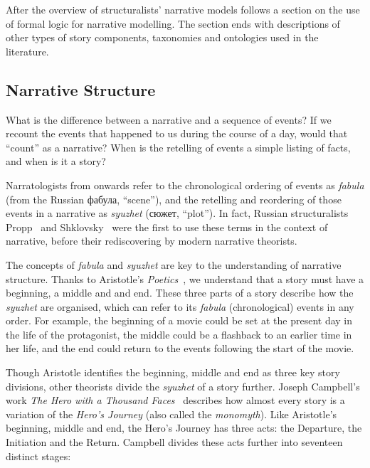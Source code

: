After the overview of structuralists' narrative models follows a section on the use of formal logic for narrative modelling. The section ends with descriptions of other types of story components, taxonomies and ontologies used in the literature.

\subsection{Narrative Structure}
What is the difference between a narrative and a sequence of events? If we
recount the events that happened to us during the course of a day, would that
``count'' as a narrative? When is the retelling of events a simple listing of
facts, and when is it a story?

Narratologists from \citep{bal2009narratology} onwards refer to the
chronological ordering of events as \emph{fabula} (from the Russian фабула, ``scene''), and the retelling and
reordering of those events in a narrative as \emph{syuzhet} (сюжет, ``plot'').
In fact, Russian structuralists Propp~\cite{propp1968morphology} and
Shklovsky~\cite{shklovsky1991theory} were the first to use these terms in the
context of narrative, before their rediscovering by modern narrative theorists.

The concepts of \emph{fabula} and \emph{syuzhet} are key to the understanding of
narrative structure. Thanks to Aristotle's
\emph{Poetics}~\cite{halliwell1968aristotle}, we understand that a story must
have a beginning, a middle and and end. These three parts of a story describe
how the \emph{syuzhet} are organised, which can refer to its \emph{fabula}
(chronological) events in any order. For example, the beginning of a movie could
be set at the present day in the life of the protagonist, the middle could be a
flashback to an earlier time in her life, and the end could return to the events
following the start of the movie.

Though Aristotle identifies the beginning, middle and end as three key story
divisions, other theorists divide the \emph{syuzhet} of a story further. Joseph
Campbell's work \emph{The Hero with a Thousand Faces}~\cite{campbell2008hero}
describes how almost every story is a variation of the \emph{Hero's Journey}
(also called the \emph{monomyth}). Like Aristotle's beginning, middle and end,
the Hero's Journey has three acts: the Departure, the Initiation and the Return.
Campbell divides these acts further into seventeen distinct stages:

